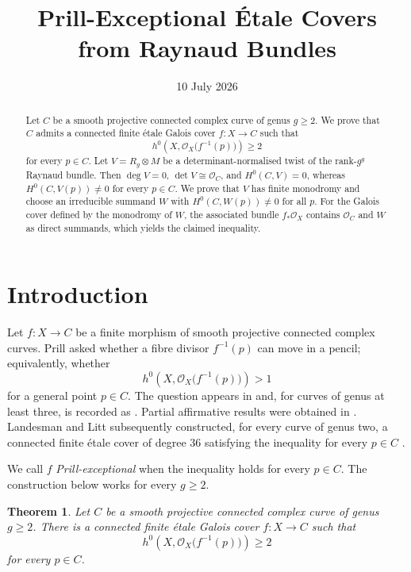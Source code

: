 \documentclass[10pt,a4paper,reqno]{amsart}
\title[Prill-exceptional covers]{Prill-Exceptional \'{E}tale Covers from Raynaud Bundles}
\author{\paperauthor}
\date{10 July 2026}
\newtheorem{theorem}{Theorem}[section]
\theoremstyle{remark}
\newcommand{\OO}{\mathcal{O}}
\newcommand{\tens}{\otimes}
\begin{document}
\begin{abstract}
Let $C$ be a smooth projective connected complex curve of genus $g\geq 2$.
We prove that $C$ admits a connected finite \'{e}tale Galois cover
$f\colon X\to C$ such that
\[
  h^0\!\left(X,\OO_X\bigl(f^{-1}(p)\bigr)\right)\geq 2
\]
for every $p\in C$.
Let $V=R_g\tens M$ be a determinant-normalised twist of the rank-$g^g$
Raynaud bundle.  Then $\deg V=0$, $\det V\cong\OO_C$, and $H^0(C,V)=0$,
whereas $H^0(C,V(p))\neq0$ for every $p\in C$.  We prove that $V$ has finite
monodromy and choose an irreducible summand $W$ with
$H^0(C,W(p))\neq0$ for all $p$.  For the Galois cover defined by the
monodromy of $W$, the associated bundle $f_*\OO_X$ contains $\OO_C$ and $W$
as direct summands, which yields the claimed inequality.
\end{abstract}

\maketitle

\section{Introduction}

Let $f\colon X\to C$ be a finite morphism of smooth projective connected
complex curves.  Prill asked whether a fibre divisor $f^{-1}(p)$ can move in
a pencil; equivalently, whether
\[
  h^0\!\left(X,\OO_X\bigl(f^{-1}(p)\bigr)\right)>1
\]
for a general point $p\in C$.  The question appears in
\cite[Chapter~VI, Exercise~D]{ACGH} and, for curves of genus at least three,
is recorded as \cite[Problem~14]{LittProblem14}.  Partial affirmative results
were obtained in \cite{BiswasButler,MohanKumar}.  Landesman and Litt
subsequently constructed, for every curve of genus two, a connected finite
\'{e}tale cover of degree $36$ satisfying the inequality for every $p\in C$
\cite{LandesmanLitt}.

We call $f$ \emph{Prill-exceptional} when the inequality holds for every
$p\in C$.  The construction below works for every $g\geq2$.

\begin{theorem}\label{thm:main}
Let $C$ be a smooth projective connected complex curve of genus $g\geq 2$.
There is a connected finite \'{e}tale Galois cover $f\colon X\to C$ such that
\[
  h^0\!\left(X,\OO_X\bigl(f^{-1}(p)\bigr)\right)\geq 2
\]
for every $p\in C$.
\end{theorem}
\end{document}
